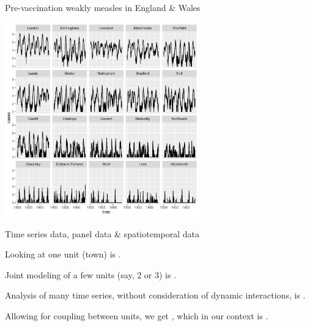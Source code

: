 \documentclass{beamer}
\begin{document}
\begin{frame}{Pre-vaccination weakly measles in England \& Wales}

  
\vspace{-2mm}

\begin{center}
\includegraphics[width=8.4cm]{he10-data.pdf}


\end{center}

\vspace{-2mm}
  
\end{frame}

\begin{frame}{Time series data, panel data \& spatiotemporal data}

  \bi
\item Looking at one unit (town) is .

  \item Joint modeling of a few units (say, 2 or 3) is .

\item Analysis of many time series, without consideration of dynamic interactions, is .

\item Allowing for coupling between units, we get , which in our context is .

  \ei

  

\end{frame}
\end{document}
